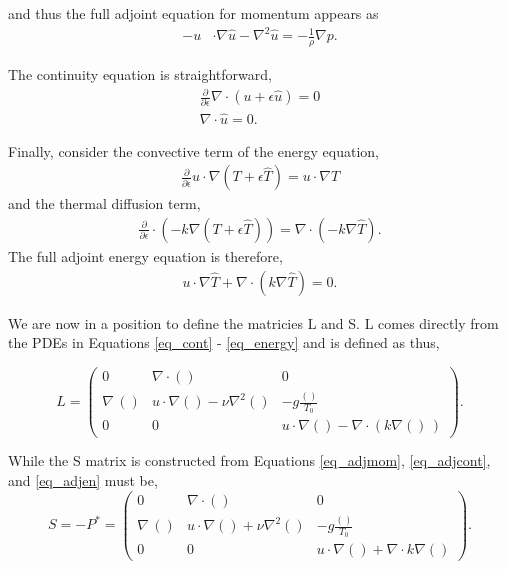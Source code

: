 and thus the full adjoint equation for momentum appears as
\begin{align}
 - u &\cdot \nabla \hat u - \nabla^2 \hat u = -\frac{1}{\rho} \nabla p. 
\label{eq_adjmom}
\end{align}

The continuity equation is straightforward, 
\begin{align}
 \frac{\partial}{\partial \epsilon} \nabla \cdot (u + \epsilon \hat
 u) = 0 \\
\nabla \cdot \hat u = 0.
\label{eq_adjcont}
\end{align}

Finally, consider the convective term of the energy equation, 
\begin{align}
 \frac{\partial}{\partial \epsilon} u \cdot \nabla (T + \epsilon \hat T)
 = u \cdot \nabla \hat T
\end{align}
and the thermal diffusion term, 
\begin{align}
 \frac{\partial}{\partial \epsilon} \cdot (-k \nabla (T + \epsilon \hat
 T)) = \nabla \cdot (-k \nabla \hat T).
\end{align}
The full adjoint energy equation is therefore, 
\begin{align}
 u \cdot \nabla \hat T + \nabla \cdot (k \nabla \hat T) =0.
\label{eq_adjen}
\end{align}

We are now in a position to define the matricies L and S. L comes
directly from the PDEs in Equations \ref{eq_cont} - \ref{eq_energy} and is
defined as thus, 

\begin{equation}
\renewcommand\arraystretch{2}
 L = 
  \begin{pmatrix}
    0 & \nabla \cdot () & 0   \\
    \nabla \,() & u \cdot \nabla() - \nu \nabla^2() & -g \frac{()}{T_0}  \\
    0 & 0 & u \cdot \nabla() - \nabla \cdot (k \nabla() \,)
  \end{pmatrix}.
\end{equation}

While the S matrix is constructed from Equations
\ref{eq_adjmom}, \ref{eq_adjcont}, and \ref{eq_adjen} must be, 
\begin{equation}
\renewcommand\arraystretch{2}
 S = -P^* = 
  \begin{pmatrix}
    0 & \nabla \cdot () & 0   \\
    \nabla \,() & u \cdot \nabla() + \nu \nabla^2() &  -g \frac{()}{T_0}  \\
    0 & 0 & u \cdot \nabla() + \nabla \cdot k \nabla()
  \end{pmatrix}.
\end{equation}

